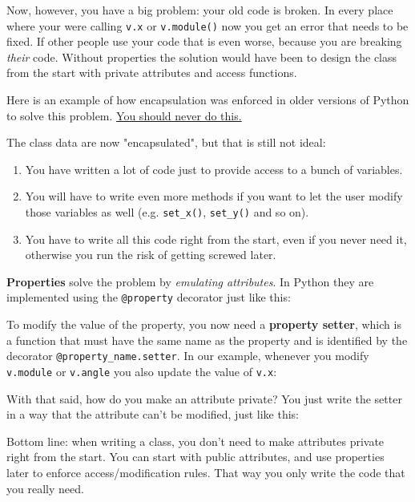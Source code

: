 

Now, however, you have a big problem: your old code is broken. In every place where your were calling \texttt{v.x} or \texttt{v.module()} now you get an error that needs to be fixed. If other people use your code that is even worse, because you are breaking \textit{their} code. Without properties the solution would have been to design the class from the start with private attributes and access functions.

Here is an example of how encapsulation was enforced in older versions of Python to solve this problem. \underline{You should never do this.}


The class data are now "encapsulated", but that is still not ideal:
\begin{enumerate}
    \item You have written a lot of code just to provide access to a bunch of variables.
    \item You will have to write even more methods if you want to let the user modify those variables as well (e.g. \texttt{set\_x()}, \texttt{set\_y()} and so on).
    \item You have to write all this code right from the start, even if you never need it, otherwise you run the risk of getting screwed later.
\end{enumerate}
\textbf{Properties} solve the problem by \textit{emulating attributes}. In Python they are implemented using the \texttt{@property} decorator just like this:



To modify the value of the property, you now need a \textbf{property setter}, which is a function that must have the same name as the property and is identified by the decorator \texttt{@property\_name.setter}. In our example, whenever you modify \texttt{v.module} or \texttt{v.angle} you also update the value of \texttt{v.x}:



With that said, how do you make an attribute private? You just write the setter in a way that the attribute can't be modified, just like this:



Bottom line: when writing a class, you don't need to make attributes private right from the start. You can start with public attributes, and use properties later to enforce access/modification rules. That way you only write the code that you really need.

